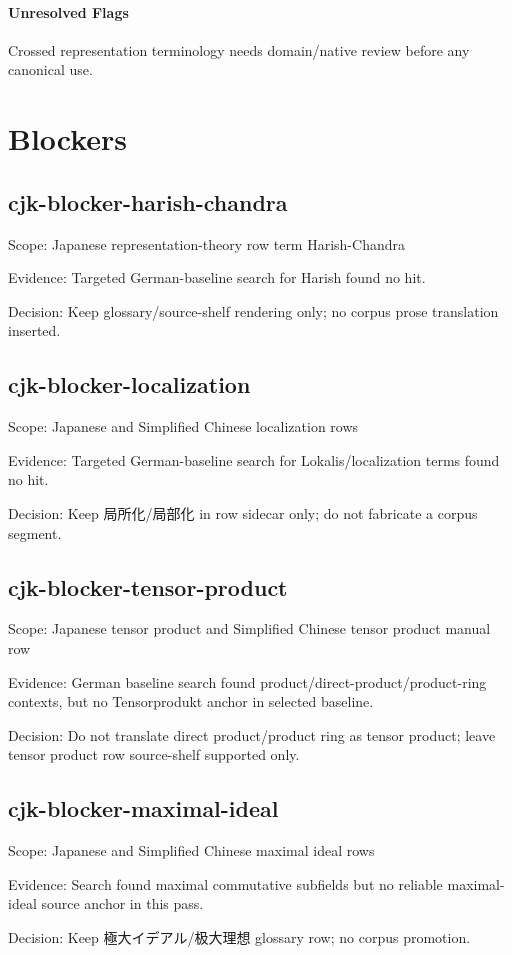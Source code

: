 \documentclass[11pt]{article}
\begin{document}
\paragraph{Unresolved Flags}
Crossed representation terminology needs domain/native review before any canonical use.\par
\section*{Blockers}
\subsection*{cjk-blocker-harish-chandra}
Scope: Japanese representation-theory row term Harish-Chandra\par
Evidence: Targeted German-baseline search for Harish found no hit.\par
Decision: Keep glossary/source-shelf rendering only; no corpus prose translation inserted.\par
\subsection*{cjk-blocker-localization}
Scope: Japanese and Simplified Chinese localization rows\par
Evidence: Targeted German-baseline search for Lokalis/localization terms found no hit.\par
Decision: Keep 局所化/局部化 in row sidecar only; do not fabricate a corpus segment.\par
\subsection*{cjk-blocker-tensor-product}
Scope: Japanese tensor product and Simplified Chinese tensor product manual row\par
Evidence: German baseline search found product/direct-product/product-ring contexts, but no Tensorprodukt anchor in selected baseline.\par
Decision: Do not translate direct product/product ring as tensor product; leave tensor product row source-shelf supported only.\par
\subsection*{cjk-blocker-maximal-ideal}
Scope: Japanese and Simplified Chinese maximal ideal rows\par
Evidence: Search found maximal commutative subfields but no reliable maximal-ideal source anchor in this pass.\par
Decision: Keep 極大イデアル/极大理想 glossary row; no corpus promotion.\par
\end{document}
